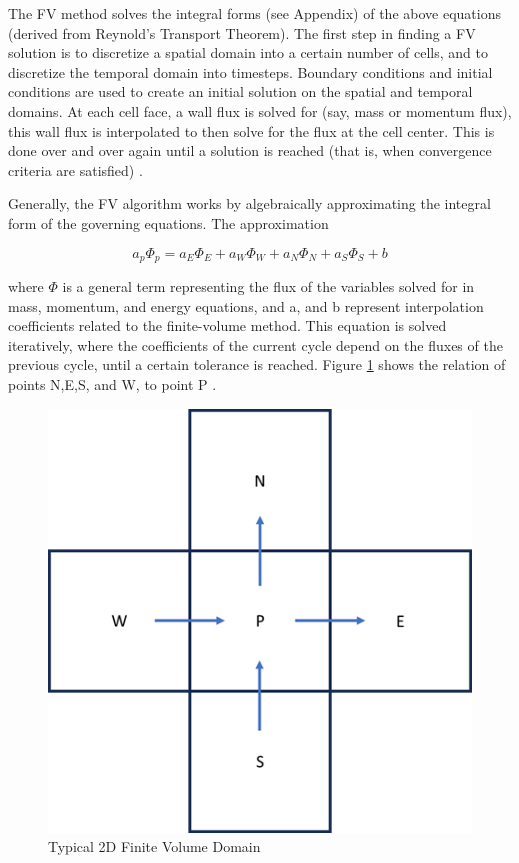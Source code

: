 \documentclass{UCF_ETD}
\begin{document}
The FV method solves the integral forms (see Appendix) of the above equations (derived from Reynold’s Transport Theorem). The first step in finding a FV solution is to discretize a spatial domain into a certain number of cells, and to discretize the temporal domain into timesteps. Boundary conditions and initial conditions are used to create an initial solution on the spatial and temporal domains. At each cell face, a wall flux is solved for (say, mass or momentum flux), this wall flux is interpolated to then solve for the flux at the cell center. This is done over and over again until a solution is reached (that is, when convergence criteria are satisfied) \cite{Anderson1995}.

Generally, the FV algorithm works by algebraically approximating the integral form of the governing equations. The approximation

\begin{equation}
    a_p\Phi_p=a_E\Phi_E+a_W\Phi_W+a_N\Phi_N+a_S\Phi_S+b
    \label{eq:Finite-Volume_approximation}
\end{equation}

where $\Phi$ is a general term representing the flux of the variables solved for in mass, momentum, and energy equations, and a, and b represent interpolation coefficients related to the finite-volume method. This equation is solved iteratively, where the coefficients of the current cycle depend on the fluxes of the previous cycle, until a certain tolerance is reached. Figure \ref{fig:FVMgrid} shows the relation of points N,E,S, and W, to point P \cite{SIMPLEC}.

\begin{figure}
    \centering
    \includegraphics{Figures/FVMgrid.png}
    \caption{Typical 2D Finite Volume Domain}
    \label{fig:FVMgrid}
\end{figure}
\end{document}
